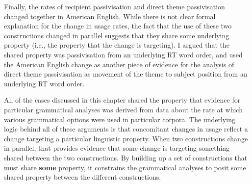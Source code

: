 	Finally, the rates of recipient passivisation and direct theme passivisation changed together in American English. While there is not clear formal explanation for the change in usage rates, the fact that the use of these two constructions changed in parallel suggests that they share some underlying property (i.e., the property that the change is targeting). I argued that the shared property was passivisation from an underlying RT word order, and used the American English change as another piece of evidence for the analysis of direct theme passivisation as movement of the theme to subject position from an underlying RT word order.

	All of the cases discussed in this chapter shared the property that evidence for particular grammatical analyses was derived from data about the rate at which various grammatical options were used in particular corpora. The underlying logic behind all of these arguments is that concomitant changes in usage reflect a change targeting a particular linguistic property. When two constructions change in parallel, that provides evidence that some change is targeting something shared between the two constructions. By building up a set of constructions that must share \textbf{some} property, it constrains the grammatical analyses to posit some shared property between the different constructions.

%
